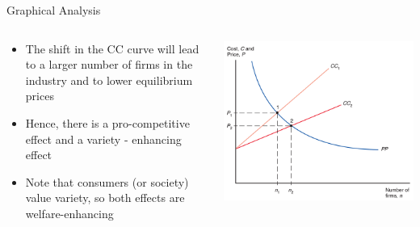 \documentclass[10pt,hyperref={CJKbookmarks=true},xcolor=dvipsnames,aspectratio=169]{beamer}
\begin{document}
\begin{frame}{Graphical Analysis }


\begin{columns}[onlytextwidth]
\begin{column}{0.5\textwidth}
\begin{itemize}
\item The shift in the CC curve will lead to a larger number of firms in
the industry and to lower equilibrium prices 
\item Hence, there is a pro-competitive effect and a variety - enhancing
effect 
\item Note that consumers (or society) value variety, so both effects are
welfare-enhancing
\end{itemize}

\end{column}
\begin{column}{0.5\textwidth}
\includegraphics[width=\columnwidth]{fig/krugman/lec6-16}
\end{column}
\end{columns}




\end{frame}
\end{document}
